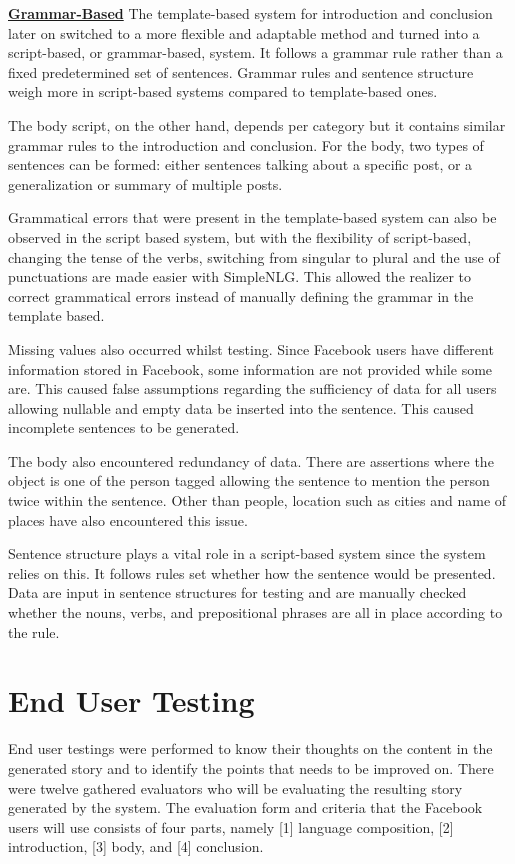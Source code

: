 \underline{\textbf{Grammar-Based}}
The template-based system for introduction and conclusion later on switched to a more flexible and adaptable method and turned into a script-based, or grammar-based, system. It follows a grammar rule rather than a fixed predetermined set of sentences. Grammar rules and sentence structure weigh more in script-based systems compared to template-based ones.

The body script, on the other hand, depends per category but it contains similar grammar rules to the introduction and conclusion. For the body, two types of sentences can be formed: either sentences talking about a specific post, or a generalization or summary of multiple posts.

Grammatical errors that were present in the template-based system can also be observed in the script based system, but with the flexibility of script-based, changing the tense of the verbs, switching from singular to plural and the use of punctuations are made easier with SimpleNLG. This allowed the realizer to correct grammatical errors instead of manually defining the grammar in the template based.

Missing values also occurred whilst testing. Since Facebook users have different information stored in Facebook, some information are not provided while some are. This caused false assumptions regarding the sufficiency of data for all users allowing nullable and empty data be inserted into the sentence. This caused incomplete sentences to be generated. 

The body also encountered redundancy of data. There are assertions where the object is one of the person tagged allowing the sentence to mention the person twice within the sentence. Other than people, location such as cities and name of places have also encountered this issue.

Sentence structure plays a vital role in a script-based system since the system relies on this. It follows rules set whether how the sentence would be presented. Data are input in sentence structures for testing and are manually checked whether the nouns, verbs, and prepositional phrases are all in place according to the rule.

\section{End User Testing}
End user testings were performed to know their thoughts on the content in the generated story and to identify the points that needs to be improved on. There were twelve gathered evaluators who will be evaluating the resulting story generated by the system. The evaluation form and criteria that the Facebook users will use consists of four parts, namely [1] language composition, [2] introduction, [3] body, and [4] conclusion.


